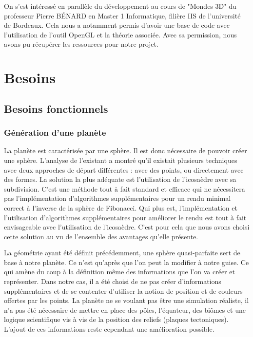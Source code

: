 \documentclass[a4paper]{article}
\begin{document}
    On s'est intéressé en parallèle du développement au cours de "Mondes 3D" du professeur Pierre BÉNARD en Master 1 Informatique, filière IIS de l'université de Bordeaux. Cela nous a notamment permis d'avoir une base de code avec l'utilisation de l'outil OpenGL et la théorie associée. Avec sa permission, nous avons pu récupérer les ressources\cite{TD_3D} pour notre projet.

\newpage 
\section{Besoins}

\subsection{Besoins fonctionnels}

\subsubsection{Génération d'une planète}

\label{geo_planet}
La planète est caractérisée par une sphère. Il est donc nécessaire de pouvoir créer une sphère. L’analyse de l’existant a montré qu’il existait plusieurs techniques avec deux approches de départ différentes : avec des points, ou directement avec des formes. La solution la plus adéquate est l’utilisation de l’icosaèdre avec sa subdivision. C’est une méthode tout à fait standard et efficace qui ne nécessitera pas l’implémentation d’algorithmes supplémentaires pour un rendu minimal correct à l’inverse de la sphère de Fibonacci. Qui plus est, l’implémentation et l’utilisation d’algorithmes supplémentaires pour améliorer le rendu est tout à fait envisageable avec l’utilisation de l’icosaèdre. C'est pour cela que nous avons choisi cette solution au vu de l'ensemble des avantages qu'elle présente.

La géométrie ayant été définit précédemment, une sphère quasi-parfaite sert de base à notre planète. Ce n’est qu'après que l'on peut la modifier à notre guise. Ce qui amène du coup à la définition même des informations que l’on va créer et représenter. Dans notre cas, il a été choisi de ne pas créer d'informations supplémentaires et de se contenter d'utiliser la notion de position et de couleurs offertes par les points. La planète ne se voulant pas être une simulation réaliste, il n'a pas été nécessaire de mettre en place des pôles, l'équateur, des biômes et une logique scientifique vis à vis de la position des reliefs (plaques tectoniques). L'ajout de ces informations reste cependant une amélioration possible.
\end{document}
